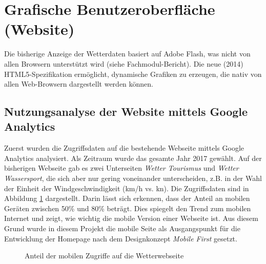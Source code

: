 \section{Grafische Benutzeroberfläche (Website)}
Die bisherige Anzeige der Wetterdaten basiert auf Adobe Flash, was nicht von allen Browsern unterstützt wird (siehe Fachmodul-Bericht). Die neue (2014) HTML5-Spezifikation ermöglicht, dynamische Grafiken zu erzeugen, die nativ von allen Web-Browsern dargestellt werden können.


\subsection{Nutzungsanalyse der Website mittels Google Analytics}
\label{subsec:googleAnalytics}
Zuerst wurden die Zugriffsdaten auf die bestehende Webseite mittels Google Analytics analysiert. Als Zeitraum wurde das gesamte Jahr 2017 gewählt. Auf der bisherigen Webseite gab es zwei Unterseiten \textit{Wetter Tourismus} und \textit{Wetter Wassersport}, die sich aber nur gering voneinander unterscheiden, z.B. in der Wahl der Einheit der Windgeschwindigkeit (km/h vs. kn). Die Zugriffsdaten sind in Abbildung \ref{img:google_mobile} dargestellt. Darin lässt sich erkennen, dass der Anteil an mobilen Geräten zwischen 50\% und 80\% beträgt. Dies spiegelt den Trend zum mobilen Internet und zeigt, wie wichtig die mobile Version einer Webseite ist. Aus diesem Grund wurde in diesem Projekt die mobile Seite als Ausgangspunkt für die Entwicklung der Homepage nach dem Designkonzept \textit{Mobile First} gesetzt.

\begin{figure}[h!]
	\centering
	\caption{Anteil der mobilen Zugriffe auf die Wetterwebseite}
	\label{img:google_mobile}
\end{figure}

